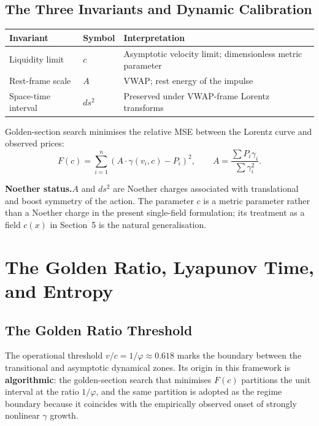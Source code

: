 \documentclass[12pt,a4paper]{article}
\begin{document}
\subsection{The Three Invariants and Dynamic Calibration}

\begin{center}
\begin{tabular}{lll}
\toprule
Invariant & Symbol & Interpretation \\
\midrule
Liquidity limit & $c$ & Asymptotic velocity limit; dimensionless metric parameter \\
Rest-frame scale & $A$ & VWAP; rest energy of the impulse \\
Space-time interval & $ds^2$ & Preserved under VWAP-frame Lorentz transforms \\
\bottomrule
\end{tabular}
\end{center}

Golden-section search minimises the relative MSE between the Lorentz
curve and observed prices:
\begin{equation}
    F(c) = \sum_{i=1}^{n}\!\left(A\cdot\gamma(v_i, c) - P_i\right)^2,
    \qquad A = \frac{\sum P_i \gamma_i}{\sum \gamma_i^2}.
\end{equation}

\textbf{Noether status.}\quad $A$ and $ds^2$ are Noether charges
associated with translational and boost symmetry of the action.
The parameter $c$ is a metric parameter rather than a Noether charge
in the present single-field formulation; its treatment as a field
$c(x)$ in Section~5 is the natural generalisation.


\section{The Golden Ratio, Lyapunov Time, and Entropy}

\subsection{The Golden Ratio Threshold}

The operational threshold $v/c = 1/\varphi \approx 0.618$ marks the
boundary between the transitional and asymptotic dynamical zones. Its
origin in this framework is \textbf{algorithmic}: the golden-section
search that minimises $F(c)$ partitions the unit interval at the ratio
$1/\varphi$, and the same partition is adopted as the regime boundary
because it coincides with the empirically observed onset of strongly
nonlinear $\gamma$ growth.
\end{document}
